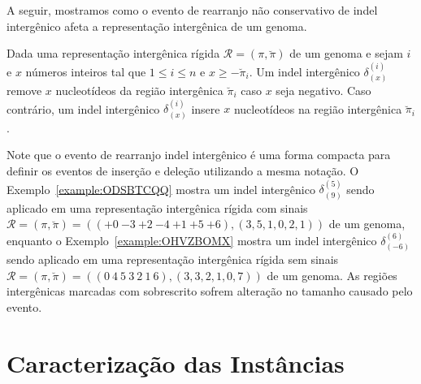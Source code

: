 A seguir, mostramos como o evento de rearranjo não conservativo de indel intergênico afeta a representação intergênica de um genoma.

\begin{definition}
Dada uma representação intergênica rígida $\mathcal{R} = (\pi,\breve\pi)$ de um genoma e sejam $i$ e $x$ números inteiros tal que $1 \le i \le n$ e $x \ge -\breve\pi_i$. Um indel intergênico $\delta^{(i)}_{(x)}$ remove $x$ nucleotídeos da região intergênica $\breve\pi_i$ caso $x$ seja negativo. Caso contrário, um indel intergênico $\delta^{(i)}_{(x)}$ insere $x$ nucleotídeos na região intergênica $\breve\pi_i$.
\end{definition}

Note que o evento de rearranjo indel intergênico é uma forma compacta para definir os eventos de inserção e deleção utilizando a mesma notação. O Exemplo~\ref{example:ODSBTCQQ} mostra um indel intergênico $\delta^{(5)}_{(9)}$ sendo aplicado em uma representação intergênica rígida com sinais $\mathcal{R} = (\pi,\breve\pi) = \allowbreak(({+0}~{-3}~{+2}~{-4}~{+1}~{+5}~{+6}),\allowbreak(3,5,1,0,2,1))$ de um genoma, enquanto o Exemplo~\ref{example:OHVZBOMX} mostra um indel intergênico $\delta^{(6)}_{(-6)}$ sendo aplicado em uma representação intergênica rígida sem sinais $\mathcal{R} = (\pi,\breve\pi) = \allowbreak(({0}~{4}~{5}~{3}~{2}~{1}~{6}),\allowbreak(3,3,2,1,0,7))$ de um genoma. As regiões intergênicas marcadas com sobrescrito sofrem alteração no tamanho causado pelo evento.





\section{Caracterização das Instâncias}

